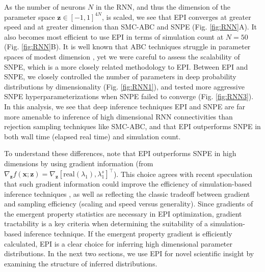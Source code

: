 \documentclass[11pt]{article}
\begin{document}
As the number of neurons $N$ in the RNN, and thus the dimension of the parameter space $\mathbf{z} \in [-1, 1]^{4N}$, is scaled, we see that EPI converges at greater speed and at greater dimension than SMC-ABC and SNPE (Fig. \ref{fig:RNN}A).
It also becomes most efficient to use EPI in terms of simulation count at $N=50$ (Fig. \ref{fig:RNN}B).
It is well known that ABC techniques struggle in parameter spaces of modest dimension \cite{sisson2018handbook}, yet we were careful to assess the scalability of SNPE, which is a more closely related methodology to EPI.
Between EPI and SNPE, we closely controlled the number of parameters in deep probability distributions by dimensionality (Fig. \ref{fig:RNN1}), and tested more aggressive SNPE hyperparameterizations when SNPE failed to converge (Fig. \ref{fig:RNN3}).
In this analysis, we see that deep inference techniques EPI and SNPE are far more amenable to inference of high dimensional RNN connectivities than rejection sampling techniques like SMC-ABC, and that EPI outperforms SNPE in both wall time (elapsed real time) and simulation count.



To understand these differences, note that EPI outperforms SNPE in high dimensions by using gradient information (from $\nabla_\mathbf{z} f(\mathbf{x}; \mathbf{z}) = \nabla_\mathbf{z} [\text{real}(\lambda_1), \lambda_1^s]^\top$).
This choice agrees with recent speculation that such gradient information could improve the efficiency of simulation-based inference techniques \cite{cranmer2020frontier}, as well as reflecting the classic tradeoff between gradient and sampling efficiency (scaling and speed versus generality).
Since gradients of the emergent property statistics are necessary in EPI optimization, gradient tractability is a key criteria when determining the suitability of a simulation-based inference technique.
If the emergent property gradient is efficiently calculated, EPI is a clear choice for inferring high dimensional parameter distributions. 
In the next two sections, we use EPI for novel scientific insight by examining the structure of inferred distributions.
\end{document}

